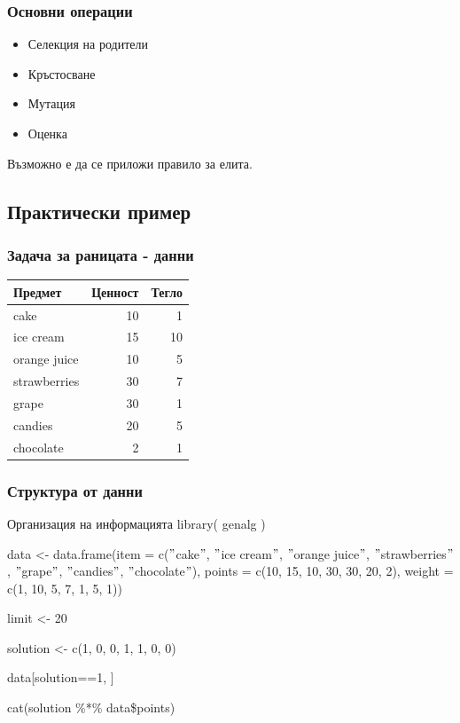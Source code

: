\documentclass{beamer}
\begin{document}
\begin{frame}
\frametitle{Основни операции}
\begin{itemize}
	\item Селекция на родители
	
	\item Кръстосване
	
	\item Мутация
	
	\item Оценка
\end{itemize}

Възможно е да се приложи правило за елита.
\end{frame}

\subsection{Практически пример}

\begin{frame}
\frametitle{Задача за раницата - данни}
\begin{table}[ht]
\centering
\begin{tabular}{|l|r|r|} 
  \hline
  Предмет & Ценност & Тегло \\ 
  \hline\hline
  cake & 10 & 1 \\
  \hline
  ice cream & 15 & 10 \\
  \hline
  orange juice & 10 & 5 \\
  \hline
  strawberries & 30 & 7 \\
  \hline
  grape & 30 & 1 \\
  \hline
  candies & 20 & 5 \\
  \hline
  chocolate & 2 & 1 \\
  \hline
\end{tabular}
\end{table}
\end{frame}

\begin{frame}
\frametitle{Структура от данни}
\begin{block}{Организация на информацията}
library( genalg )

data <- data.frame(item = c($"$cake$"$, $"$ice cream$"$, $"$orange juice$"$, $"$strawberries$"$, $"$grape$"$, $"$candies$"$, $"$chocolate$"$), points = c(10, 15, 10, 30, 30, 20, 2), weight = c(1, 10, 5, 7, 1, 5, 1))

limit <- 20

solution <- c(1, 0, 0, 1, 1, 0, 0)

data[solution==1, ]

cat(solution \%*\% data\$points)
\end{block}
\end{frame}
\end{document}
